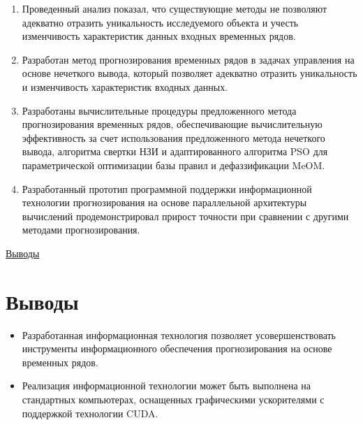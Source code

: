 \begin{enumerate}
	\item Проведенный анализ показал, что существующие методы не позволяют адекватно отразить уникальность исследуемого объекта и учесть изменчивость характеристик данных входных временных рядов. 
	\item Разработан метод прогнозирования временных рядов в задачах управления на основе нечеткого вывода, который позволяет адекватно отразить уникальность и изменчивость характеристик входных данных.
	\item Разработаны вычислительные процедуры предложенного метода прогнозирования временных рядов, обеспечивающие вычислительную эффективность за счет использования предложенного метода нечеткого вывода, алгоритма свертки НЗИ и адаптированного алгоритма PSO для параметрической оптимизации базы правил и дефаззификации MeOM.
	\item Разработанный прототип программной поддержки информационной технологии прогнозирования на основе параллельной архитектуры вычислений продемонстрировал прирост точности при сравнении с другими методами прогнозирования.
\end{enumerate}


\ifsynopsis
\ul{Выводы}
\else
\section*{Выводы}
\fi

\begin{itemize}
	\item Разработанная информационная технология позволяет усовершенствовать инструменты информационного обеспечения прогнозирования на основе временных рядов.
	\item Реализация информационной технологии может быть выполнена на стандартных компьютерах, оснащенных графическими ускорителями с поддержкой технологии CUDA.
\end{itemize}


